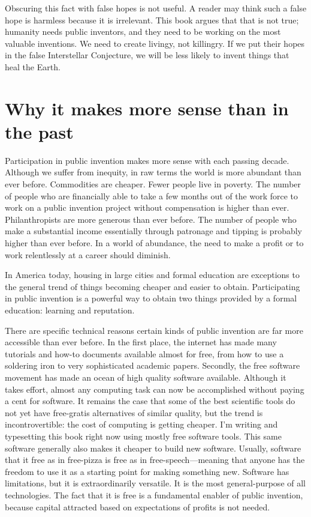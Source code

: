 \documentclass[
	fontsize=10pt, %
	twoside=false, %
	secnumdepth=1, %
]{kaobook}
\begin{document}
Obscuring this fact with false hopes is not useful.
A reader may think such a false hope is harmless because it is irrelevant.
This book argues that that is not true; humanity needs public inventors, and they need to be working
on the most valuable inventions.
We need to create livingy, not killingry.
If we put their hopes in the false Interstellar Conjecture, we will be less likely to invent
things that heal the Earth.

\chapter{Why it makes more sense than in the past}

Participation in public invention makes more sense with
each passing decade.
Although we suffer from inequity, in raw terms the world
is more abundant than ever before.
Commodities are cheaper.
Fewer people live in poverty.
The number of people who are financially able to take
a few months out of the work force to work on a public invention
project without compensation is higher than ever.
Philanthropists are more generous than ever before.
The number of people who make a substantial income
essentially through patronage and tipping is probably
higher than ever before.
In a world of abundance, the need to make a profit
or to work relentlessly at a career should
diminish.

In America today, housing in large cities
and formal education are exceptions
to the general trend of things becoming cheaper and easier to obtain.
Participating in public invention is a powerful way to
obtain two things provided by a formal education:
learning and reputation.

There are specific technical reasons certain kinds of
public invention are far more accessible than ever before.
In the first place, the internet has made many tutorials
and how-to documents available almost for free, from
how to use a soldering iron to very sophisticated academic
papers.
Secondly, the free software movement has made an ocean
of high quality software available.
Although it takes effort, almost any computing task can
now be accomplished without paying a cent for software.
It remains the case that some of the best scientific tools
do not yet have free-gratis alternatives of similar quality,
but the trend is incontrovertible: the cost of computing
is getting cheaper.
I'm writing and typesetting this book right now
using mostly free software tools.
This same software generally also makes it cheaper to
build new software.
Usually, software that it free
as in free-pizza is free as in free-speech---meaning that
anyone has the freedom to use it as a starting point for making
something new.
Software has limitations, but it is extraordinarily versatile.
It is the most general-purpose of all technologies. The fact
that it is free is a fundamental enabler of public invention,
because capital attracted based on expectations of profits is
not needed.
\end{document}
